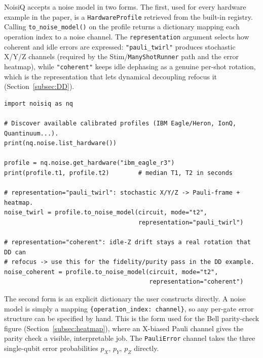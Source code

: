 \documentclass[10pt,twocolumn]{article}
\begin{document}
NoisiQ accepts a noise model in two forms. The first, used for every hardware
example in the paper, is a \texttt{HardwareProfile} retrieved from the built-in
registry. Calling \texttt{to\_noise\_model()} on the profile returns a
dictionary mapping each operation index to a noise channel.  The
\texttt{representation} argument selects how coherent and idle errors are
expressed: \texttt{"pauli\_twirl"} produces stochastic X/Y/Z channels (required
by the Stim/\texttt{ManyShotRunner} path and the error heatmap), while
\texttt{"coherent"} keeps idle dephasing as a genuine per-shot rotation, which
is the representation that lets dynamical decoupling refocus it
(Section~\ref{subsec:DD}).
 
\begin{lstlisting}[style=noisiqpython, caption={Passing a noise model from a
hardware profile. \texttt{list\_hardware()} enumerates the registry; the
chosen profile builds a per-operation channel dictionary.}, label={lst:noise_hw}]
import noisiq as nq
 
# Discover available calibrated profiles (IBM Eagle/Heron, IonQ, Quantinuum...).
print(nq.noise.list_hardware())
 
profile = nq.noise.get_hardware("ibm_eagle_r3")
print(profile.t1, profile.t2)        # median T1, T2 in seconds
 
# representation="pauli_twirl": stochastic X/Y/Z -> Pauli-frame + heatmap.
noise_twirl = profile.to_noise_model(circuit, mode="t2",
                                     representation="pauli_twirl")
 
# representation="coherent": idle-Z drift stays a real rotation that DD can
# refocus -> use this for the fidelity/purity pass in the DD example.
noise_coherent = profile.to_noise_model(circuit, mode="t2",
                                        representation="coherent")
\end{lstlisting}
 
The second form is an explicit dictionary the user constructs directly. A
noise model is simply a mapping \texttt{\{operation\_index: channel\}}, so any
per-gate error structure can be specified by hand. This is the form used for
the Bell parity-check figure (Section~\ref{subsec:heatmap}), where an X-biased
Pauli channel gives the parity check a visible, interpretable job. The
\texttt{PauliError} channel takes the three single-qubit error probabilities
$p_X$, $p_Y$, $p_Z$ directly.
 
\end{document}
